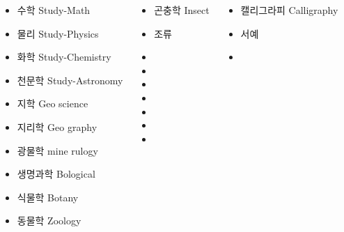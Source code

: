 \documentclass[	25pt, 
							a1paper, 
							landscape,
							margin=0mm, %
							innermargin=10mm,  		%
							blockverticalspace=4mm, %
							colspace=5mm, 
							subcolspace=0mm
							]{tikzposter}
\begin{document}
\begin{columns}


			{
					\begin{itemize}
					\item 수학       Study-Math
					\item 물리       Study-Physics
					\item 화학       Study-Chemistry
					\item 천문학    Study-Astronomy
					\item 지학       Geo science
					\item 지리학    Geo graphy
					\item 광물학    mine rulogy
					\item 생명과학 Bological 
					\item 식물학    Botany
					\item 동물학    Zoology
					\end{itemize}
			} %


			{
					\begin{itemize}
					\item 곤충학 Insect
					\item 조류
					\item 
					\item 
					\item 
					\item 
					\item 
					\item 
					\item 
					\end{itemize}
			} %






			{
					\begin{itemize}
					\item 캘리그라피 Calligraphy
					\item 서예
					\item 
					\end{itemize}
			} %



\end{columns}
\end{document}
